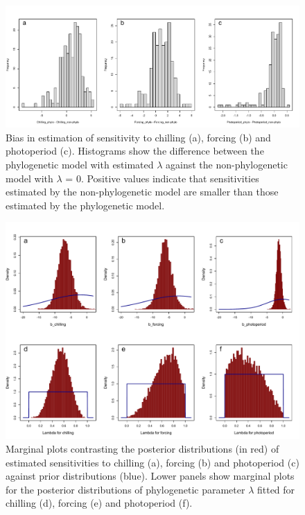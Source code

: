 \documentclass[11pt]{article}
\begin{document}
\clearpage
\begin{figure}
  \begin{center}
  \includegraphics[width=14cm]{../../analyses/phylogeny/figures/FigSXX_bias_sens_phylo_nonphylo.pdf}
  \caption{Bias in estimation of sensitivity to chilling (a), forcing (b) and photoperiod (c). Histograms show the difference between the phylogenetic model with estimated $\lambda$ against the non-phylogenetic model with $\lambda$ = 0. Positive values indicate that sensitivities estimated by the non-phylogenetic model are smaller than those estimated by the phylogenetic model.}
  \label{fig:biasestimation}
  \end{center}
\end{figure}



\clearpage
\begin{figure}
  \begin{center}
  \includegraphics[width=14cm]{../../analyses/phylogeny/figures/FigSXX_marginal_plots_betas_lambda.pdf}
  \caption{Marginal plots contrasting the posterior distributions (in red) of estimated sensitivities to chilling (a), forcing (b) and photoperiod (c) against prior distributions (blue). Lower panels show marginal plots for the posterior distributions of phylogenetic parameter $\lambda$ fitted for chilling (d), forcing (e) and photoperiod (f).}
  \label{fig:marginalplots}
  \end{center}
\end{figure}
\end{document}
